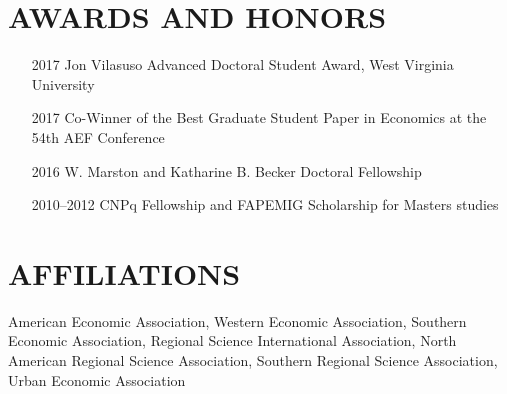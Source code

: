 \documentclass[11pt,a4paper,oneside]{article}
\begin{document}
\section{AWARDS AND HONORS}
\begin{itemize}[align=left]
  \item[2017] Jon Vilasuso Advanced Doctoral Student Award, West Virginia University
  \item[2017] Co-Winner of the Best Graduate Student Paper in Economics at the 54th AEF Conference
  \item[2016] W. Marston and Katharine B. Becker Doctoral Fellowship
  \item[2010--2012] CNPq Fellowship and FAPEMIG Scholarship for Masters studies
\end{itemize}

\section{AFFILIATIONS}
American Economic Association, Western Economic Association, Southern Economic Association, Regional Science International Association, North American Regional Science Association, Southern Regional Science Association, Urban Economic Association

\end{document}

